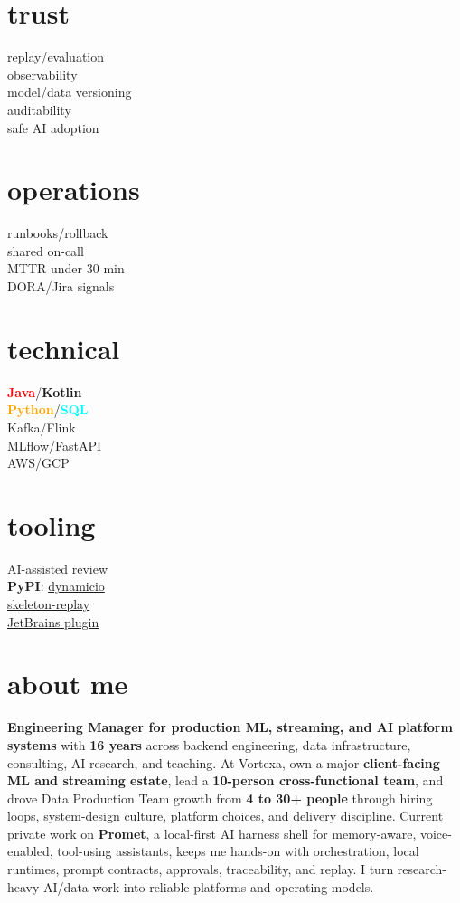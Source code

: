 \documentclass[]{../../../../friggeri-cv}
\begin{document}
\begin{aside}
    \section{trust}
        {\footnotesize replay/evaluation\\observability\\model/data versioning\\auditability\\safe AI adoption}
    \section{operations}
        {\footnotesize runbooks/rollback\\shared on-call\\MTTR under 30 min\\DORA/Jira signals}
    \section{technical}
        {\footnotesize \textbf{\textcolor{red}{Java}}/\textbf{\textcolor{red!50!black}{Kotlin}}\\\textbf{\textcolor{orange}{Python}}/\textbf{\textcolor{cyan}{SQL}}\\Kafka/Flink\\MLflow/FastAPI\\AWS/GCP}
    \section{tooling}
        {\footnotesize AI-assisted review\\\textbf{PyPI}: \href{https://pypi.org/project/dynamicio/}{dynamicio}\\\href{https://pypi.org/project/skeleton-replay/}{skeleton-replay}\\\href{https://plugins.jetbrains.com/plugin/32807-skeleton-replay}{JetBrains plugin}}
\end{aside}

\section{about me}
{\small \textbf{Engineering Manager for production ML, streaming, and AI platform systems} with \textbf{16 years} across backend engineering, data infrastructure, consulting, AI research, and teaching. At Vortexa, own a major \textbf{client-facing ML and streaming estate}, lead a \textbf{10-person cross-functional team}, and drove Data Production Team growth from \textbf{4 to 30+ people} through hiring loops, system-design culture, platform choices, and delivery discipline. Current private work on \textbf{Promet}, a local-first AI harness shell for memory-aware, voice-enabled, tool-using assistants, keeps me hands-on with orchestration, local runtimes, prompt contracts, approvals, traceability, and replay. I turn research-heavy AI/data work into reliable platforms and operating models.}
\end{document}
